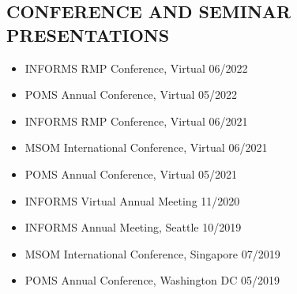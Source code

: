 \documentclass[margin]{res} %
\begin{document}
\begin{resume}




\section{CONFERENCE AND SEMINAR PRESENTATIONS}
\begin{itemize}[leftmargin=*]
    \item INFORMS RMP Conference, Virtual \hfill 06/2022
    \item POMS Annual Conference, Virtual \hfill 05/2022
    \item INFORMS RMP Conference, Virtual \hfill 06/2021
    \item MSOM International Conference, Virtual \hfill 06/2021
    \item POMS Annual Conference, Virtual \hfill 05/2021
    \item INFORMS Virtual Annual Meeting \hfill 11/2020
    \item INFORMS Annual Meeting, Seattle \hfill 10/2019
    \item MSOM International Conference, Singapore \hfill 07/2019
    \item POMS Annual Conference, Washington DC \hfill 05/2019
\end{itemize}


\end{resume}
\end{document}
